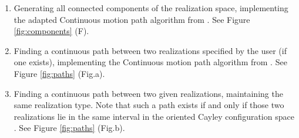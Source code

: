 \documentclass[10pt]{article}
\begin{document}
\begin{enumerate}

\item Generating all connected components of the realization space,
implementing the adapted Continuous motion path algorithm from \cite{sitharam2014beast}.
See Figure \ref{fig:components}  (F). 

\item Finding a continuous path between two realizations specified by the user (if one exists),
implementing the Continuous motion path algorithm from \cite{Sitharam2011a}.
See Figure \ref{fig:paths} (Fig.a). 


\item Finding a continuous path between two given realizations,
maintaining the same realization type.
Note that such a path exists if and only if those two realizations lie in the same interval in the oriented Cayley configuration space \cite{Sitharam2011a}. 
See Figure \ref{fig:paths} (Fig.b). 


\end{enumerate}
\end{document}
